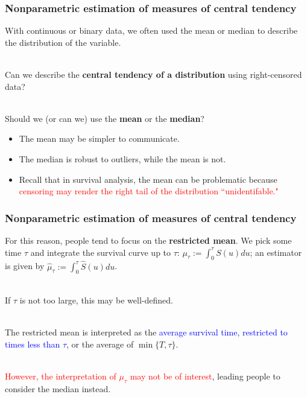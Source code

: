 \documentclass[10pt,t]{beamer}
\begin{document}
\begin{frame}
\frametitle{Nonparametric estimation of measures of central tendency}

With continuous or binary data, we often used the mean or median to describe the distribution of the variable.
\\ ~\ 

Can we describe the \textbf{central tendency of a distribution} using right-censored data?
\\ ~\ 

Should we (or can we) use the \textbf{mean} or the \textbf{median}?
\begin{itemize}
\item The mean may be simpler to communicate.
\item The median is robust to outliers, while the mean is not.
\item Recall that in survival analysis, the mean can be problematic because \textcolor{red}{censoring may render the right tail of the distribution ``unidentifable."}
\end{itemize}
\end{frame}

\begin{frame}
\frametitle{Nonparametric estimation of measures of central tendency}

For this reason, people tend to focus on the \textbf{restricted mean}. We pick some time $\tau$ and integrate the survival curve up to $\tau$: $\mu_\tau := \int_0^\tau S(u) du$; an estimator is given by $\widehat{\mu}_\tau := \int_0^\tau \widehat{S}(u)du$.
\\ ~\ 

If $\tau$ is not too large, this may be well-defined. 
\\ ~\ 

The restricted mean is interpreted as the \textcolor{blue}{average survival time, restricted to times less than $\tau$}, or the average of $\min\{T, \tau\}$.
\\ ~\ 

\textcolor{red}{However, the interpretation of $\mu_\tau$ may not be of interest}, leading people to consider the median instead.
\end{frame}
\end{document}
